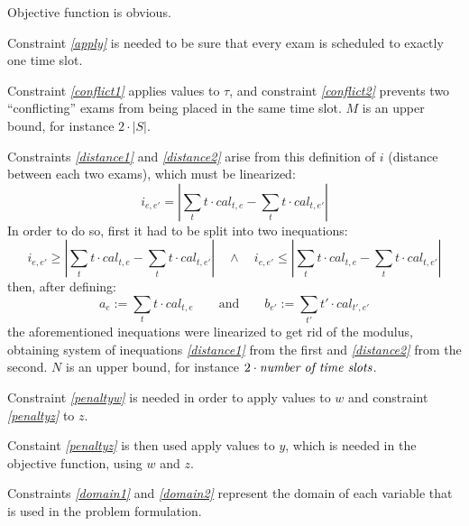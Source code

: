 \documentclass[11pt, a4paper, leqno]{article}
\newcommand{\eq}[1]{\textit{\ref{#1}}}
\begin{document}
	Objective function is obvious.
	
	Constraint \eq{apply} is needed to be sure that every exam is scheduled to exactly one time slot.
	
	Constraint \eq{conflict1} applies values to $\tau$, and constraint \eq{conflict2} prevents two ``conflicting'' exams from being placed in the same time slot. $M$ is an upper bound, for instance $2\cdot\left|S\right|$.
	
	Constraints \eq{distance1} and \eq{distance2} arise from this definition of $i$ (distance between each two exams), which must be linearized:
	\[
	i_{e,e'} = \left|\sum_{t} t\cdot cal_{t,e} - \sum_{t} t\cdot cal_{t,e'}\right|
	\]
	In order to do so, first it had to be split into two inequations:
	\[
		i_{e,e'} \geq \left|\sum_{t} t\cdot cal_{t,e} - \sum_{t} t\cdot cal_{t,e'}\right| \quad \land \quad i_{e,e'} \leq \left|\sum_{t} t\cdot cal_{t,e} - \sum_{t} t\cdot cal_{t,e'}\right|
	\]
	then, after defining:
	\[
	a_e := \sum_{t} t\cdot cal_{t,e} \qquad\text{and}\qquad b_{e'} := \sum_{t'} t'\cdot cal_{t',e'}
	\]
	the aforementioned inequations were linearized to get rid of the modulus, obtaining system of inequations \eq{distance1} from the first and \eq{distance2} from the second. $N$ is an upper bound, for instance \mbox{$2\cdot\text{\textit{number of time slots}}$}.

	Constraint \eq{penaltyw} is needed in order to apply values to $w$ and constraint \eq{penaltyz} to $z$.
	
	Constaint \eq{penaltyz} is then used apply values to $y$, which is needed in the objective function, using $w$ and $z$.
	
	Constraints \eq{domain1} and \eq{domain2} represent the domain of each variable that is used in the problem formulation.
\end{document}
